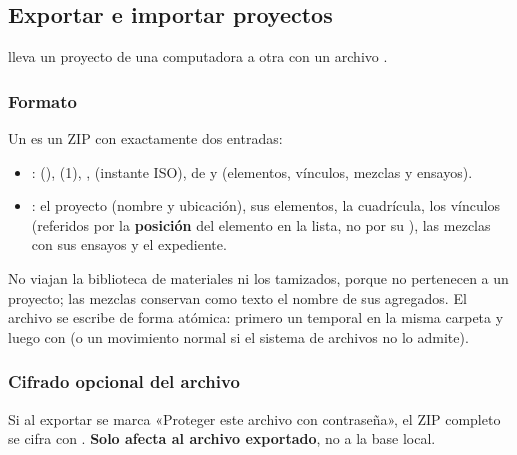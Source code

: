 \subsection{Exportar e importar proyectos}
\label{sec:bd-intercambio}

 lleva un proyecto de una computadora a otra con un archivo .

\subsubsection{Formato}

Un  es un ZIP con exactamente dos entradas:

\begin{itemize}
	\item {}:  (),  (1),
	      ,  (instante ISO),  de  y 
	      (elementos, vínculos, mezclas y ensayos).
	\item {}: el proyecto (nombre y ubicación), sus elementos, la cuadrícula, los vínculos (referidos por
	      la \textbf{posición} del elemento en la lista, no por su ), las mezclas con sus ensayos y el expediente.
\end{itemize}

No viajan la biblioteca de materiales ni los tamizados, porque no pertenecen a un proyecto; las mezclas conservan como
texto el nombre de sus agregados. El archivo se escribe de forma atómica: primero un temporal en la misma carpeta y
luego  con  (o un movimiento normal si el sistema de archivos no lo admite).

\subsubsection{Cifrado opcional del archivo}

Si al exportar se marca «Proteger este archivo con contraseña», el ZIP completo se cifra con .
\textbf{Solo afecta al archivo exportado}, no a la base local.


